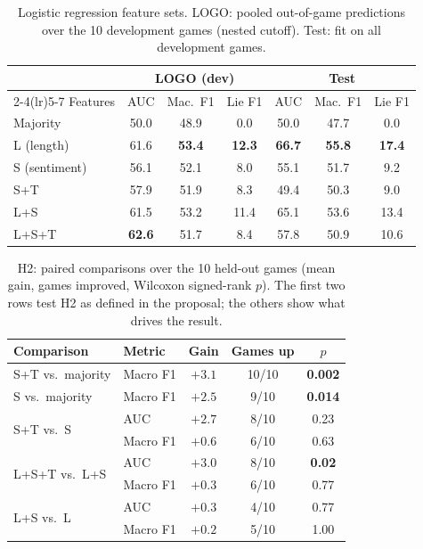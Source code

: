 \documentclass[conference]{IEEEtran}
\newcommand{\best}[1]{\textbf{#1}}
\begin{document}
\begin{table}[t]
\centering
\caption{Logistic regression feature sets. LOGO: pooled out-of-game predictions over the 10 development games (nested cutoff). Test: fit on all development games.}
\label{tab:lr}
\setlength{\tabcolsep}{3.5pt}
\begin{tabular}{lcccccc}
\toprule
 & \multicolumn{3}{c}{LOGO (dev)} & \multicolumn{3}{c}{Test} \\
\cmidrule(lr){2-4}\cmidrule(lr){5-7}
Features & AUC & Mac.\ F1 & Lie F1 & AUC & Mac.\ F1 & Lie F1 \\
\midrule
Majority         & 50.0 & 48.9 & \phantom{0}0.0 & 50.0 & 47.7 & \phantom{0}0.0 \\
L (length)     & 61.6 & \best{53.4} & \best{12.3} & \best{66.7} & \best{55.8} & \best{17.4} \\
S (sentiment)    & 56.1 & 52.1 & \phantom{0}8.0 & 55.1 & 51.7 & \phantom{0}9.2 \\
S+T              & 57.9 & 51.9 & \phantom{0}8.3 & 49.4 & 50.3 & \phantom{0}9.0 \\
L+S              & 61.5 & 53.2 & 11.4 & 65.1 & 53.6 & 13.4 \\
L+S+T            & \best{62.6} & 51.7 & \phantom{0}8.4 & 57.8 & 50.9 & 10.6 \\
\bottomrule
\end{tabular}
\end{table}

\begin{table}[t]
\centering
\caption{H2: paired comparisons over the 10 held-out games (mean gain, games improved, Wilcoxon signed-rank $p$). The first two rows test H2 as defined in the proposal; the others show what drives the result.}
\label{tab:h2}
\setlength{\tabcolsep}{4pt}
\begin{tabular}{llccc}
\toprule
Comparison & Metric & Gain & Games up & $p$ \\
\midrule
S+T vs.\ majority & Macro F1 & $+3.1$ & 10/10 & \best{0.002} \\
S vs.\ majority   & Macro F1 & $+2.5$ & 9/10 & \best{0.014} \\
\midrule
\multirow{2}{*}{S+T vs.\ S}     & AUC      & $+2.7$ & 8/10 & 0.23 \\
                                 & Macro F1 & $+0.6$ & 6/10 & 0.63 \\
\midrule
\multirow{2}{*}{L+S+T vs.\ L+S} & AUC      & $+3.0$ & 8/10 & \best{0.02} \\
                                 & Macro F1 & $+0.3$ & 6/10 & 0.77 \\
\midrule
\multirow{2}{*}{L+S vs.\ L}     & AUC      & $+0.3$ & 4/10 & 0.77 \\
                                 & Macro F1 & $+0.2$ & 5/10 & 1.00 \\
\bottomrule
\end{tabular}
\end{table}
\end{document}

